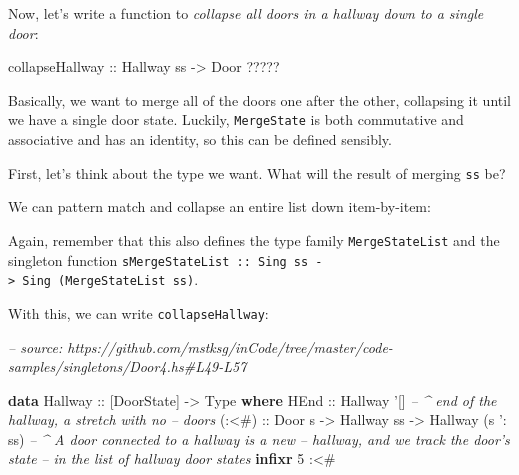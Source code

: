 \documentclass[]{article}
\newenvironment{Shaded}{}{}
\newcommand{\CommentTok}[1]{\textcolor[rgb]{0.38,0.63,0.69}{\textit{#1}}}
\newcommand{\DataTypeTok}[1]{\textcolor[rgb]{0.56,0.13,0.00}{#1}}
\newcommand{\DecValTok}[1]{\textcolor[rgb]{0.25,0.63,0.44}{#1}}
\newcommand{\FunctionTok}[1]{\textcolor[rgb]{0.02,0.16,0.49}{#1}}
\newcommand{\KeywordTok}[1]{\textcolor[rgb]{0.00,0.44,0.13}{\textbf{#1}}}
\newcommand{\NormalTok}[1]{#1}
\newcommand{\OtherTok}[1]{\textcolor[rgb]{0.00,0.44,0.13}{#1}}
\begin{document}
Now, let's write a function to \emph{collapse all doors in a hallway down to a
single door}:

\begin{Shaded}
\begin{Highlighting}[]
\OtherTok{collapseHallway ::} \DataTypeTok{Hallway}\NormalTok{ ss }\OtherTok{->} \DataTypeTok{Door} \FunctionTok{?????}
\end{Highlighting}
\end{Shaded}

Basically, we want to merge all of the doors one after the other, collapsing it
until we have a single door state. Luckily, \texttt{MergeState} is both
commutative and associative and has an identity, so this can be defined
sensibly.

First, let's think about the type we want. What will the result of merging
\texttt{ss} be?

We can pattern match and collapse an entire list down item-by-item:

\begin{Shaded}
\end{Shaded}

Again, remember that this also defines the type family \texttt{MergeStateList}
and the singleton function
\texttt{sMergeStateList\ ::\ Sing\ ss\ -\textgreater{}\ Sing\ (MergeStateList\ ss)}.

With this, we can write \texttt{collapseHallway}:

\begin{Shaded}
\begin{Highlighting}[]
\CommentTok{-- source: https://github.com/mstksg/inCode/tree/master/code-samples/singletons/Door4.hs#L49-L57}

\KeywordTok{data} \DataTypeTok{Hallway}\OtherTok{ ::}\NormalTok{ [}\DataTypeTok{DoorState}\NormalTok{] }\OtherTok{->} \DataTypeTok{Type} \KeywordTok{where}
    \DataTypeTok{HEnd}\OtherTok{  ::} \DataTypeTok{Hallway}\NormalTok{ '[]        }\CommentTok{-- ^ end of the hallway, a stretch with no}
                                \CommentTok{--   doors}
\OtherTok{    (:<#) ::} \DataTypeTok{Door}\NormalTok{ s}
          \OtherTok{->} \DataTypeTok{Hallway}\NormalTok{ ss}
          \OtherTok{->} \DataTypeTok{Hallway}\NormalTok{ (s '}\FunctionTok{:}\NormalTok{ ss)  }\CommentTok{-- ^ A door connected to a hallway is a new}
                                \CommentTok{--   hallway, and we track the door's state}
                                \CommentTok{--   in the list of hallway door states}
\KeywordTok{infixr} \DecValTok{5} \FunctionTok{:<#}
\end{Highlighting}
\end{Shaded}
\end{document}

